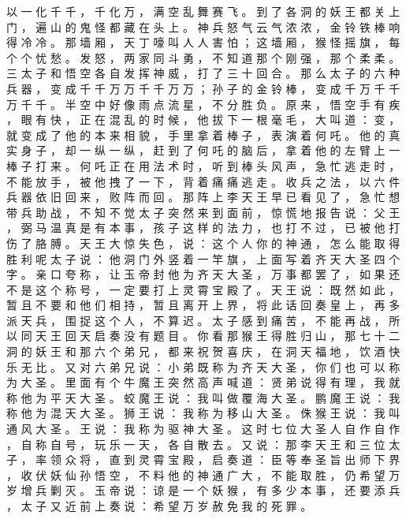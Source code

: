 {以 一 化 千 千 ， 千 化 万 ， 满 空 乱 舞 赛 飞 。
到 了 各 洞 的 妖 王 都 关 上 门 ， 遍 山 的 鬼 怪 都 藏 在 头 上 。
神 兵 怒 气 云 气 浓 浓 ， 金 铃 铁 棒 响 得 冷 冷 。
那 墙 厢 ， 天 丁 嚎 叫 人 人 害 怕 ； 这 墙 厢 ， 猴 怪 摇 旗 ， 每 个 个 忧 愁 。
发 怒 ， 两 家 同 斗 勇 ， 不 知 道 那 个 刚 强 ， 那 个 柔 柔 。
三 太 子 和 悟 空 各 自 发 挥 神 威 ， 打 了 三 十 回 合 。
那 么 太 子 的 六 种 兵 器 ， 变 成 千 千 万 万 千 千 万 万 ； 孙 子 的 金 铃 棒 ， 变 成 千 万 千 千 万 千 千 。
半 空 中 好 像 雨 点 流 星 ， 不 分 胜 负 。
原 来 ， 悟 空 手 有 疾 ， 眼 有 快 ， 正 在 混 乱 的 时 候 ， 他 拔 下 一 根 毫 毛 ， 大 叫 道 ： 变 ， 就 变 成 了 他 的 本 来 相 貌 ， 手 里 拿 着 棒 子 ， 表 演 着 何 吒 。 他 的 真 实 身 子 ， 却 一 纵 一 纵 ， 赶 到 了 何 吒 的 脑 后 ， 拿 着 他 的 左 臂 上 一 棒 子 打 来 。
何 吒 正 在 用 法 术 时 ， 听 到 棒 头 风 声 ， 急 忙 逃 走 时 ， 不 能 放 手 ， 被 他 拽 了 一 下 ， 背 着 痛 痛 逃 走 。
收 兵 之 法 ， 以 六 件 兵 器 依 旧 回 来 ， 败 阵 而 回 。
那 阵 上 李 天 王 早 已 看 见 了 ， 急 忙 想 带 兵 助 战 ， 不 知 不 觉 太 子 突 然 来 到 面 前 ， 惊 慌 地 报 告 说 ： 父 王 ， 弼 马 温 真 是 有 本 事 ， 孩 子 这 样 的 法 力 ， 也 打 不 过 ， 已 被 他 打 伤 了 胳 膊 。
天 王 大 惊 失 色 ， 说 ： 这 个 人 你 的 神 通 ， 怎 么 能 取 得 胜 利 呢 太 子 说 ： 他 洞 门 外 竖 着 一 竿 旗 ， 上 面 写 着 齐 天 大 圣 四 个 字 。
亲 口 夸 称 ， 让 玉 帝 封 他 为 齐 天 大 圣 ， 万 事 都 罢 了 ， 如 果 还 不 是 这 个 称 号 ， 一 定 要 打 上 灵 霄 宝 殿 了 。
天 王 说 ： 既 然 如 此 ， 暂 且 不 要 和 他 们 相 持 ， 暂 且 离 开 上 界 ， 将 此 话 回 奏 皇 上 ， 再 多 派 天 兵 ， 围 捉 这 个 人 ， 不 算 迟 。
太 子 感 到 痛 苦 ， 不 能 再 战 ， 所 以 同 天 王 回 天 启 奏 没 有 题 目 。
你 看 那 猴 王 得 胜 归 山 ， 那 七 十 二 洞 的 妖 王 和 那 六 个 弟 兄 ， 都 来 祝 贺 喜 庆 ， 在 洞 天 福 地 ， 饮 酒 快 乐 无 比 。
又 对 六 弟 兄 说 ： 小 弟 既 称 为 齐 天 大 圣 ， 你 们 也 可 以 称 为 大 圣 。
里 面 有 个 牛 魔 王 突 然 高 声 喊 道 ： 贤 弟 说 得 有 理 ， 我 就 称 他 为 平 天 大 圣 。
蛟 魔 王 说 ： 我 叫 做 覆 海 大 圣 。
鹏 魔 王 说 ： 我 称 他 为 混 天 大 圣 。
狮 王 说 ： 我 称 为 移 山 大 圣 。
侏 猴 王 说 ： 我 叫 通 风 大 圣 。
王 说 ： 我 称 为 驱 神 大 圣 。
这 时 七 位 大 圣 人 自 作 自 作 ， 自 称 自 号 ， 玩 乐 一 天 ， 各 自 散 去 。
又 说 ： 那 李 天 王 和 三 位 太 子 ， 率 领 众 将 ， 直 到 灵 霄 宝 殿 ， 启 奏 道 ： 臣 等 奉 圣 旨 出 师 下 界 ， 收 伏 妖 仙 孙 悟 空 ， 不 料 他 的 神 通 广 大 ， 不 能 取 胜 ， 仍 希 望 万 岁 增 兵 剿 灭 。
玉 帝 说 ： 谅 是 一 个 妖 猴 ， 有 多 少 本 事 ， 还 要 添 兵 ， 太 子 又 近 前 上 奏 说 ： 希 望 万 岁 赦 免 我 的 死 罪 。
}
